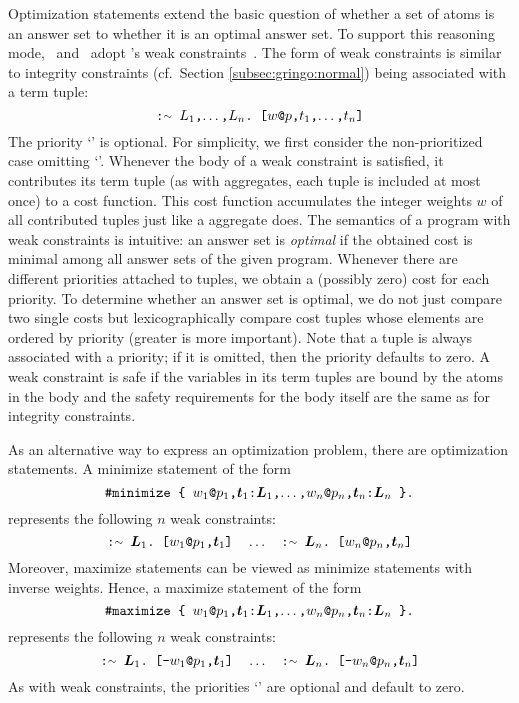 Optimization statements extend the basic question of
whether a set of atoms is an answer set to
whether it is an optimal answer set.
To support this reasoning mode, \gringo\ and \clingo\ adopt \dlv's weak constraints~\cite{bflnrp00}.
The form of weak constraints is similar to integrity constraints (cf.~Section \ref{subsec:gringo:normal})
being associated with a term tuple:
\[
    \code{:{\raise.17ex\hbox{$\scriptstyle\sim$}}~$L_1$,$\dots$,$L_n$.~[$w$@$p$,$t_1$,$\dots$,$t_n$]}
\]
The priority `' is optional.
For simplicity, we first consider the non-prioritized case omitting `'.
Whenever the body of a weak constraint is satisfied,
it contributes its term tuple (as with aggregates, each tuple is included at most once) to a cost function.
This cost function accumulates the integer weights $w$ of all contributed tuples just like a  aggregate does.
The semantics of a program with weak constraints is intuitive:
an answer set is \emph{optimal}
if the obtained cost is minimal among all answer sets of the given program.
Whenever there are different priorities attached to tuples,
we obtain a (possibly zero) cost for each priority.
To determine whether an answer set is optimal,
we do not just compare two single costs
but lexicographically compare cost tuples whose elements are ordered by priority (greater is more important).
Note that a tuple is always associated with a priority;
if it is omitted, then the priority defaults to zero.
A weak constraint is safe if the variables in its term tuples are bound by the atoms in the body
and the safety requirements for the body itself are the same as for integrity constraints.

As an alternative way to express an optimization problem,
there are optimization statements.
A minimize statement of the form
\[
    \texttt{\#minimize~\{~$w_1$@$p_1$,$\boldsymbol{t}_1$:$\boldsymbol{L}_1$,$\dots$,$w_n$@$p_n$,$\boldsymbol{t}_n$:$\boldsymbol{L}_n$~\}.}
\]
represents the following $n$ weak constraints:
\[
    \code{:\Sim~$\boldsymbol{L}_1$.~[$w_1$@$p_1$,$\boldsymbol{t}_1$]}
    \quad \dots \quad
    \code{:\Sim~$\boldsymbol{L}_n$.~[$w_n$@$p_n$,$\boldsymbol{t}_n$]}
\]
%
Moreover, maximize statements can be viewed as minimize statements
with inverse weights.
Hence, a maximize statement of the form
\[
    \texttt{\#maximize~\{~$w_1$@$p_1$,$\boldsymbol{t}_1$:$\boldsymbol{L}_1$,$\dots$,$w_n$@$p_n$,$\boldsymbol{t}_n$:$\boldsymbol{L}_n$~\}.}
\]
represents the following $n$ weak constraints:
\[
    \code{:\Sim~$\boldsymbol{L}_1$.~[-$w_1$@$p_1$,$\boldsymbol{t}_1$]}
    \quad \dots \quad
    \code{:\Sim~$\boldsymbol{L}_n$.~[-$w_n$@$p_n$,$\boldsymbol{t}_n$]}
\]
As with weak constraints, the priorities `' are optional
and default to zero.

